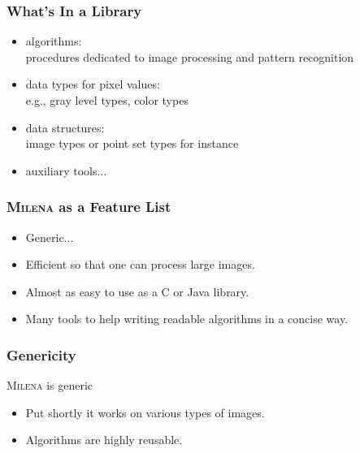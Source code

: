 \documentclass{beamer}
\newcommand{\mln}{\textsc{Milena}\xspace}
\begin{document}
\begin{frame}%
  \frametitle{What's In a Library}

  \begin{itemize}
  \item algorithms:\\
    procedures dedicated to image processing and pattern recognition
    \smallskip
  \item data types for pixel values:\\
    e.g., gray level types, color types
    \smallskip
  \item data structures:\\
    image types or point set types for instance
    \smallskip
  \item auxiliary tools...
  \end{itemize}

\end{frame}


\begin{frame}
  \frametitle{\mln as a Feature List}

  \begin{itemize}
  \item Generic...
  \item Efficient so that one can process large images.
  \item Almost as easy to use as a C or Java library.
  \item Many tools to help writing readable algorithms in a concise way.
  \end{itemize}

\end{frame}


\begin{frame}
  \frametitle{Genericity}

  \begin{block}{\mln is generic}
    \begin{itemize}
    \item Put shortly it works on various types of images.
    \item Algorithms are highly reusable.
    \end{itemize}
  \end{block}


\end{frame}
\end{document}
